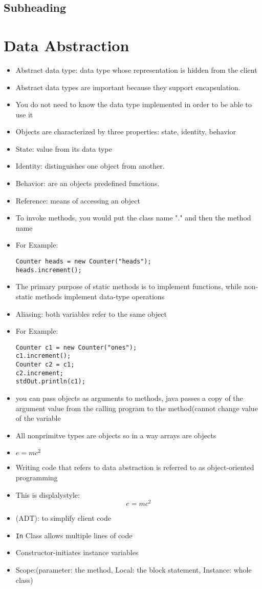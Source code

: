\documentclass[11pt]{report}
\begin{document}
\section{Subheading}
\label{sec:orgeeaa098}
\chapter{Data Abstraction}
\label{sec:org02be6ea}
\begin{itemize}
\item Abstract data type: data type whose representation is hidden from the client
\item Abstract data types are important because they support encapsulation.
\item You do not need to know the data type implemented in order to be able to use it
\item Objects are characterized by three properties: state, identity, behavior
\item State: value from its data type
\item Identity: distinguishes one object from another.
\item Behavior: are an objects predefined functions.
\item Reference: means of accessing an object
\item To invoke methods, you would put the class name "." and then the method
name
\item For Example:
\begin{verbatim}
Counter heads = new Counter("heads");
heads.increment();
\end{verbatim}
\item The primary purpose of static methods is to implement functions,
while non-static methods implement data-type operations
\item Aliasing: both variables refer to the same object
\item For Example:
\begin{verbatim}
Counter c1 = new Counter("ones");
c1.increment();
Counter c2 = c1;
c2.increment;
stdOut.println(c1);
\end{verbatim}
\item you can pass objects as arguments to methods, java passes
a copy of the argument value from the calling program to the
method(cannot change value of the variable
\item All nonprimitve types are objects so in a way arrays are objects
\item \(e=mc^2\)
\item Writing code that refers to data abstraction is referred to as
object-oriented programming
\item This is displalystyle: $$e=mc^2$$
\item (ADT): to simplify client code
\item \texttt{In} Class allows multiple lines of code
\item Constructor-initiates instance variables
\item Scope:(parameter: the method, Local: the block statement, Instance: whole class)


\end{itemize}
\end{document}
